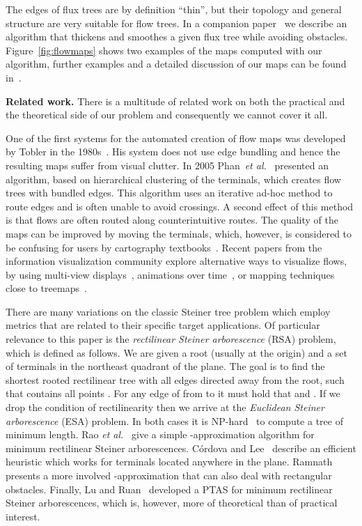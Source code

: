 \documentclass{journalA4}
\newcommand{\etal}{{\emph{et al.}\xspace}}
\begin{document}
The edges of flux trees are by definition ``thin'', but their topology and general structure are very suitable for flow trees. In a companion paper~\cite{InfoVisFlowMap} we describe an algorithm that thickens and smoothes a given flux tree while avoiding obstacles. Figure~\ref{fig:flowmaps} shows two examples of the maps computed with our algorithm, further examples and a detailed discussion of our maps can be found in~\cite{InfoVisFlowMap}.

\smallskip\noindent
{\bfseries Related work.} There is a multitude of related work on both the practical and the theoretical side of our problem and consequently we cannot cover it all.

One of the first systems for the automated creation of flow maps was developed by Tobler in the 1980s~\cite{FlowMapper,WaldoTobler1987}. His system does not use edge bundling and hence the resulting maps suffer from visual clutter. In 2005 Phan~\etal~\cite{Phan2005} presented an algorithm, based on hierarchical clustering of the terminals, which creates flow trees with bundled edges. This algorithm uses an iterative ad-hoc method to route edges and is often unable to avoid crossings. A second effect of this method is that flows are often routed along counterintuitive routes. The quality of the maps can be improved by moving the terminals, which, however, is considered to be confusing for users by cartography textbooks~\cite{Slocum2010}. Recent papers from the information visualization community explore alternative ways to visualize flows, by using multi-view displays~\cite{Guo2009}, animations over time~\cite{Boyandin2010}, or mapping techniques close to treemaps~\cite{Wood2010}.

There are many variations on the classic Steiner tree problem which employ metrics that are related to their specific target applications. Of particular relevance to this paper is the \emph{rectilinear Steiner arborescence} (RSA) problem, which is defined as follows. We are given a root (usually at the origin) and a set of terminals  in the northeast quadrant of the plane. The goal is to find the shortest rooted rectilinear tree  with all edges directed away from the root, such that  contains all points . For any edge of  from  to  it must hold that  and . If we drop the condition of rectilinearity then we arrive at the \emph{Euclidean Steiner arborescence} (ESA) problem. In both cases it is  NP-hard~\cite{Shi2000,ss-rsap-05} to compute a tree of minimum length. Rao \etal~\cite{Rao92} give a simple -approximation algorithm for minimum rectilinear Steiner arborescences. C\'{o}rdova and Lee~\cite{Cordova94} describe an efficient heuristic which works for terminals located anywhere in the plane. Ramnath~\cite{Ramnath03} presents a more involved -approximation that can also deal with rectangular obstacles.  Finally, Lu and Ruan~\cite{Lu2000} developed a PTAS for minimum rectilinear Steiner arborescences, which is, however, more of theoretical than of practical interest.
\end{document}
